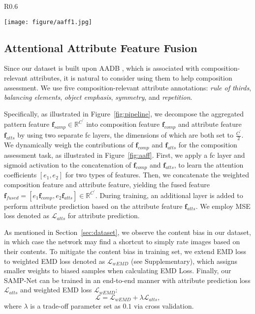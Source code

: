 \documentclass{bmvc2k}
\begin{document}
\begin{wrapfigure}{R}{0.6\linewidth}
  \vspace{-8mm}
  \begin{center}
    \texttt{[image: figure/aaff1.jpg]}
  \end{center}
  \vspace{-5mm}
  \caption{Attentional Attribute Feature Fusion (AAFF) module. \emph{fc} means a fully-connected layer with $\mathrm{sigmoid}$ activation and $e_1, e_2$ are attention coefficients.}
  \label{fig:aaff}
\end{wrapfigure}
\subsection{Attentional Attribute Feature Fusion}
\label{aaff}
Since our dataset is built upon AADB \cite{Kong2016PhotoAR}, which is associated with composition-relevant attributes, it is natural to consider using them to help composition assessment. We use five composition-relevant attribute annotations: \emph{rule of thirds}, \emph{balancing elements}, \emph{object emphasis}, \emph{symmetry}, and \emph{repetition}. 

Specifically, as illustrated in Figure~\ref{fig:pipeline}, we decompose the aggregated pattern feature $\mathbf{f}_{samp} \in \mathbb{R}^{C^{\prime}}$ into composition feature $\mathbf{f}_{comp}$ and attribute feature $\mathbf{f}_{atts}$ by using two separate fc layers, the dimensions of which are both set to $\frac{C^{\prime}} {2}$. We dynamically weigh the contributions of $\mathbf{f}_{comp}$ and $\mathbf{f}_{atts}$ for the composition assessment task, as illustrated in Figure~\ref{fig:aaff}. First, we apply a fc layer and $\mathrm{sigmoid}$ activation to the concatenation of  $\mathbf{f}_{comp}$ and $\mathbf{f}_{atts}$, to learn the attention coefficients $[e_1, e_2]$ for two types of features. Then, we concatenate the weighted composition feature and attribute feature, yielding the fused feature $\mathbf{f}_{fused} = [e_1 \mathbf{f}_{comp}, e_2 \mathbf{f}_{atts} ] \in \mathbb{R}^{C^{\prime}}$. During training, an additional layer is added to perform attribute prediction based on the attribute feature $\mathbf{f}_{atts}$. We employ MSE loss denoted as $\mathcal{L}_{atts}$ for attribute prediction.

As mentioned in Section~\ref{sec:dataset}, we observe the content bias in our dataset, in which case the network may find a shortcut to simply rate images based on their contents.
To mitigate the content bias in training set, we extend EMD loss to weighted EMD loss denoted as  $\mathcal{L}_{wEMD}$ (see Supplementary), which assigns smaller weights to biased samples when calculating EMD Loss.
Finally, our SAMP-Net can be trained in an end-to-end manner with attribute prediction loss $\mathcal{L}_{atts}$ and weighted EMD loss $\mathcal{L}_{wEMD}$:
\begin{equation}
    \mathcal{L} = \mathcal{L}_{wEMD} + \lambda \mathcal{L}_{atts},
    \label{total_loss}
\end{equation}
where $\lambda$ is a trade-off parameter set as $0.1$ via cross validation.
\end{document}
